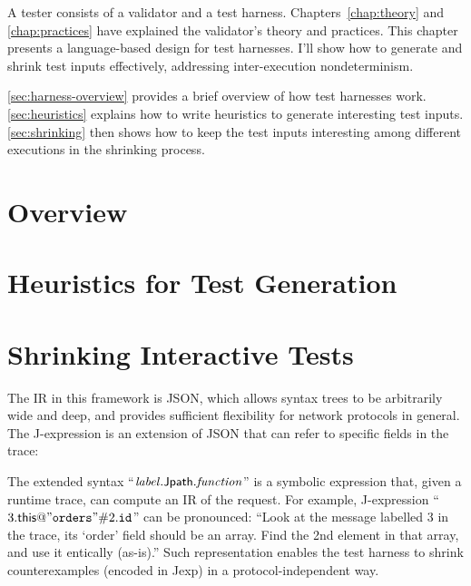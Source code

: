 A tester consists of a validator and a test harness.  Chapters~\ref{chap:theory}
and \ref{chap:practices} have explained the validator's theory and practices.
This chapter presents a language-based design for test harnesses.  I'll show how
to generate and shrink test inputs effectively, addressing inter-execution
nondeterminism.

\autoref{sec:harness-overview} provides a brief overview of how test harnesses
work.  \autoref{sec:heuristics} explains how to write heuristics to generate
interesting test inputs.  \autoref{sec:shrinking} then shows how to keep the
test inputs interesting among different executions in the shrinking process.

\section{Overview}
\label{sec:harness-overview}


\section{Heuristics for Test Generation}
\label{sec:heuristics}


\section{Shrinking Interactive Tests}
\label{sec:shrinking}



The IR in this framework is JSON, which allows syntax trees to be arbitrarily
wide and deep, and provides sufficient flexibility for network protocols in
general.  The J-expression is an extension of JSON that can refer to specific
fields in the trace:

The extended syntax
``$\mathit{label}.\mathsf{Jpath}.\mathit{function}$'' is a symbolic
expression that, given a runtime trace, can compute an IR of the request.  For
example, J-expression
``$3.\mathsf{this}@\mathtt{"orders"}\#2.\mathtt{id}$'' can be
pronounced: ``Look at the message labelled 3 in the trace, its `order' field
should be an array.  Find the 2nd element in that array, and use it
entically (as-is).''  Such representation enables the test harness to
shrink counterexamples (encoded in Jexp) in a protocol-independent way.


